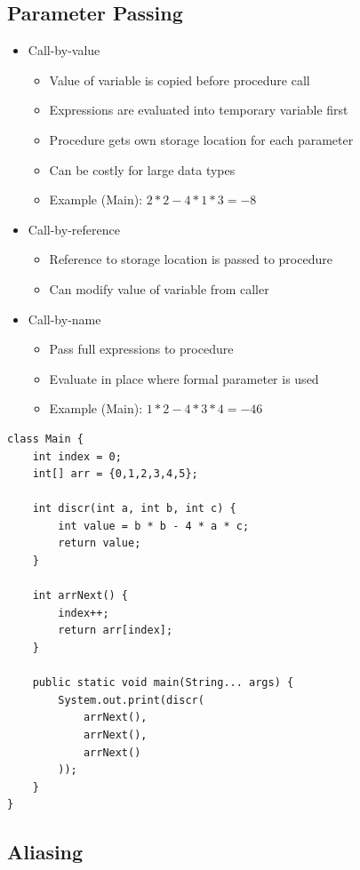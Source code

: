 \documentclass{scrartcl}
\begin{document}
\subsection{Parameter Passing}

\begin{itemize}
	\item Call-by-value
	\begin{itemize}
		\item Value of variable is copied before procedure call
		\item Expressions are evaluated into temporary variable first
		\item Procedure gets own storage location for each parameter
		\item Can be costly for large data types
		\item Example (Main): $ 2*2-4*1*3=-8 $
	\end{itemize}
	\item Call-by-reference
	\begin{itemize}
		\item Reference to storage location is passed to procedure
		\item Can modify value of variable from caller
	\end{itemize}
	\item Call-by-name
	\begin{itemize}
		\item Pass full expressions to procedure
		\item Evaluate in place where formal parameter is used
		\item Example (Main): $ 1*2-4*3*4=-46 $
	\end{itemize}
\end{itemize}

\begin{lstlisting}
class Main {
    int index = 0;
    int[] arr = {0,1,2,3,4,5};
    
    int discr(int a, int b, int c) {
        int value = b * b - 4 * a * c;
        return value;
    }

    int arrNext() {
    	index++;
    	return arr[index];
    }

    public static void main(String... args) {
    	System.out.print(discr(
    	    arrNext(), 
    	    arrNext(), 
    	    arrNext()
    	));
    }
}
\end{lstlisting}

\subsection{Aliasing}
\end{document}
